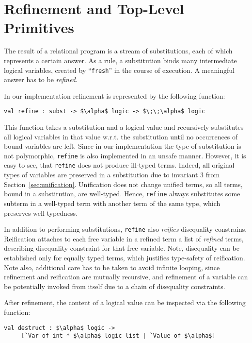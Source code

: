 \section{Refinement and Top-Level Primitives}
\label{refinement}

The result of a relational program is a stream of substitutions, each of which represents
a certain answer. As a rule, a substitution binds many intermediate logical variables, 
created by ``\lstinline{fresh}'' in the course of execution. A meaningful answer has to be
\emph{refined}.

In our implementation refinement is represented by the following function:

\begin{lstlisting}[mathescape=true]
   val refine : subst -> $\alpha$ logic -> $\;\;\alpha$ logic
\end{lstlisting}

This function takes a substitution and a logical value and recursively substitutes
all logical variables in that value w.r.t. the substitution until no occurrences of 
bound variables are left. Since in our implementation the type of substitution is
not polymorphic, \lstinline{refine} is also implemented in an unsafe manner. However,
it is easy to see, that \lstinline{refine} does not produce ill-typed terms. Indeed,
all original types of variables are preserved in a substitution due to invariant
3 from Section~\ref{sec:unification}. Unification does not change unified terms, so all terms, 
bound in a substitution, are well-typed. Hence, \lstinline{refine} always substitutes
some subterm in a well-typed term with another term of the same type, which preserves
well-typedness.

In addition to performing substitutions, \lstinline{refine} also \emph{reifies} 
disequality constrains. Reification attaches to each free variable in a refined
term a list of \emph{refined} terms, describing disequality constraint for that
free variable. Note, disequality can be established only for equally typed
terms, which justifies type-safety of reification. Note also, additional care has 
to be taken to avoid infinite looping, since refinement and reification are
mutually recursive, and refinement of a variable can be potentially invoked from 
itself due to a chain of disequality constraints.

After refinement, the content of a logical value can be inspected via the following 
function:

\begin{lstlisting}[mathescape=true]
   val destruct : $\alpha$ logic -> 
     [`Var of int * $\alpha$ logic list | `Value of $\alpha$]
\end{lstlisting}

